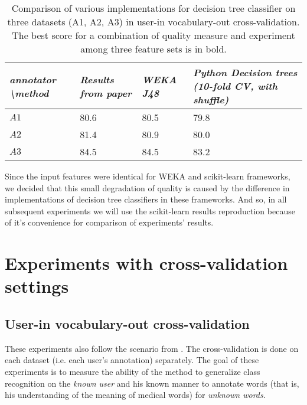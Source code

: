 \begin{table*}[h]
\begin{tabular}{L|LLL}
\hline
\textit{annotator \textbackslash method} & \textit{Results from paper \citep{Grabar-PITR2014}} & \textit{WEKA J48} & \textit{Python Decision trees (10-fold CV, with shuffle)} \\ \hline
$A1$ & 80.6 & 80.5 & 79.8 \\
$A2$ & 81.4 & 80.9 & 80.0 \\
$A3$ & 84.5 & 84.5 & 83.2 \\ \hline
\end{tabular}
    \caption{Comparison of various implementations for decision tree classifier on three datasets (A1, A2, A3) in user-in vocabulary-out cross-validation. The best score for a combination of quality measure and experiment among three feature sets is in bold.}
    \label{tab:results-reproduction}
\end{table*}

Since the input features were identical for WEKA and scikit-learn frameworks, we decided that this small degradation of quality is caused by the difference in implementations of decision tree classifiers in these frameworks. And so, in all subsequent experiments we will use the scikit-learn results reproduction because of it's convenience for comparison of experiments' results. 


\section{Experiments with cross-validation settings}
\label{sec:cv-experiments}
\subsection{User-in vocabulary-out cross-validation}

These experiments also follow the scenario from \cite{Grabar-PITR2014}. The cross-validation is done on each dataset (i.e. each user's annotation) separately. The goal of these experiments is to measure the ability of the method to generalize class recognition on the \textit{known user} and his known manner to annotate words (that is, his understanding of the meaning of medical words) for \textit{unknown words}. 

